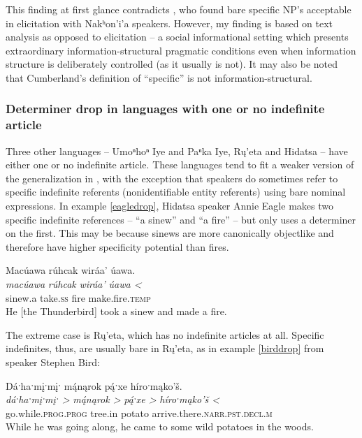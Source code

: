 \documentclass[output=paper]{LSP/langsci}
\begin{document}
This finding at first glance contradicts \citet{Cumberland2005}, who found bare specific NP’s acceptable in elicitation with Nakʰon’i’a speakers. However, my finding is based on text analysis as opposed to elicitation -- a social informational setting which presents extraordinary information-structural pragmatic conditions even when information structure is deliberately controlled (as it usually is not). It may also be noted that Cumberland’s definition of “specific” is not information-structural.

\subsubsection{Determiner drop in languages with one or no indefinite article}\label{droponeindef}

Three other languages -- Umoⁿhoⁿ Iye and Paⁿka Iye, Rų’eta and Hidatsa -- have either one or no indefinite article. These languages tend to fit a weaker version of the generalization in , with the exception that speakers do sometimes refer to specific indefinite referents (nonidentifiable entity referents) using bare nominal expressions. In example \ref{eagledrop}, Hidatsa speaker Annie Eagle makes two specific indefinite references -- “a sinew” and “a fire” -- but only uses a determiner on the first. This may be because sinews are more canonically objectlike and therefore have higher specificity potential than fires.

\ea\label{eagledrop}
Macúawa rúhcak wiráa’ úawa.\footnotemark\\
\gll	\emph{macúawa} 	\emph{rúhcak} 	\emph{wiráa’}	\emph{úawa <}\\
	sinew.a 		take.\textsc{ss} 	fire 			make.fire.\textsc{temp}\\
\glt	He [the Thunderbird] took a sinew and made a fire.
\z

The extreme case is Rų’eta, which has no indefinite articles at all. Specific indefinites, thus, are usually bare in Rų’eta, as in example \ref{birddrop} from speaker Stephen Bird:

\ea\label{birddrop}
Dáˑhaˑmįˑmįˑ m\'{ą}nąrok p\'{ą}ˑxe híroˑmąko’š.\footnotemark\\
\gll	\emph{dáˑhaˑmįˑmįˑ >}		\emph{m\'{ą}nąrok >}	\emph{p\'{ą}ˑxe >}	\emph{híroˑmąko’š <}\\
	go.while.\textsc{prog.prog} 	tree.in 			potato 		arrive.there.\textsc{narr.pst.decl.m}\\
\glt	While he was going along, he came to some wild potatoes in the woods.
\z
\end{document}
